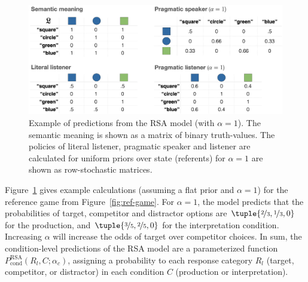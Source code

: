 \documentclass[fleqn]{article}
\begin{document}
\begin{figure}[t]
  \centering
  \includegraphics[width = 0.9 \textwidth]{00-pics/RSA-example.png}
  \caption{
    Example of predictions from the RSA model (with $\alpha=1$).
    The semantic meaning is shown as a matrix of binary truth-values.
    The policies of literal listener, pragmatic speaker and listener are calculated for uniform priors over state (referents) for $\alpha=1$ are shown as row-stochastic matrices.
  }
  \label{fig:RSA-example}
\end{figure}

Figure~\ref{fig:RSA-example} gives example calculations (assuming a flat prior and $\alpha=1$) for the reference game from Figure~\ref{fig:ref-game}.
For $\alpha=1$, the model predicts that the probabilities of target, competitor and distractor options are $\tuple{\nicefrac{2}{3}, \nicefrac{1}{3}, 0}$ for the production, and $\tuple{\nicefrac{3}{5}, \nicefrac{2}{5}, 0}$ for the interpretation condition.
Increasing $\alpha$ will increase the odds of target over competitor choices.
In sum, the condition-level predictions of the RSA model are a parameterized function $P_{\text{cond}}^{\text{RSA}}(R_{l}, C; \alpha_{c})$, assigning a probability to each response category $R_{l}$ (target, competitor, or distractor) in each condition $C$ (production or interpretation).
\end{document}
